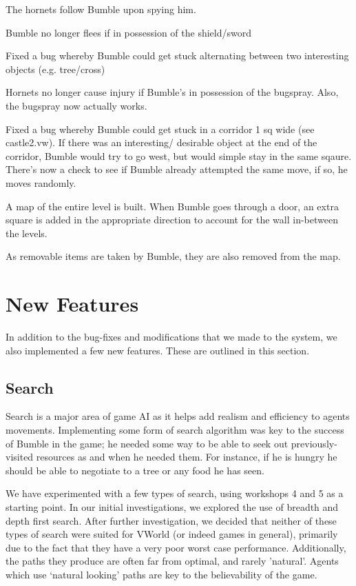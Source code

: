 \documentclass[a4paper,oneside]{report}
\begin{document}
The hornets follow Bumble upon spying him.

Bumble no longer flees if in possession of the shield/sword

Fixed a bug whereby Bumble could get stuck alternating between two interesting objects (e.g. tree/cross)

Hornets no longer cause injury if Bumble's in possession of the bugspray. Also, the bugspray now actually works.

Fixed a bug whereby Bumble could get stuck in a corridor 1 sq wide (see castle2.vw). 
If there was an interesting/ desirable object at the end of the corridor, Bumble would try to go west, but would simple stay in the same sqaure. There's now a check to see if Bumble already attempted the same move, if so, he moves randomly.

A map of the entire level is built. When Bumble goes through a door, an extra square is added in the appropriate direction to account for the wall in-between the levels. 

As removable items are taken by Bumble, they are also removed from the map.

\section{New Features}

In addition to the bug-fixes and modifications that we made to the system, we also implemented a few new features. These are outlined in this section.

\subsection{Search}

Search is a major area of game AI as it helps add realism and efficiency to agents movements. Implementing some form of search algorithm was key to the success of Bumble in the game; he needed some way to be able to seek out previously-visited resources as and when he needed them. For instance, if he is hungry he should be able to negotiate to a tree or any food he has seen. 

We have experimented with a few types of search, using workshops 4 and 5 as a starting point. In our initial investigations, we explored the use of breadth and depth first search. After further investigation, we decided that neither of these types of search were suited for VWorld (or indeed games in general), primarily due to the fact that they have a very poor worst case performance. Additionally, the paths they produce are often far from optimal, and rarely 'natural'. Agents which use `natural looking' paths are key to the believability of the game. 
\end{document}
